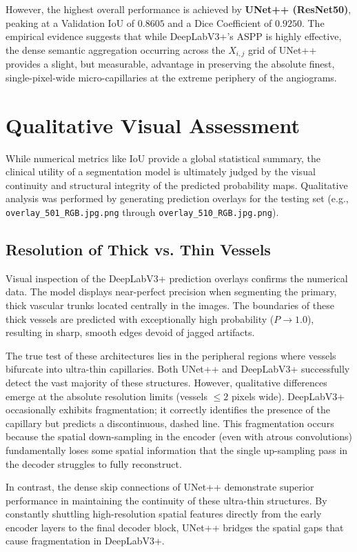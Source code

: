 However, the highest overall performance is achieved by \textbf{UNet++ (ResNet50)}, peaking at a Validation IoU of $0.8605$ and a Dice Coefficient of $0.9250$. The empirical evidence suggests that while DeepLabV3+'s ASPP is highly effective, the dense semantic aggregation occurring across the $X_{i,j}$ grid of UNet++ provides a slight, but measurable, advantage in preserving the absolute finest, single-pixel-wide micro-capillaries at the extreme periphery of the angiograms.

\section{Qualitative Visual Assessment}
While numerical metrics like IoU provide a global statistical summary, the clinical utility of a segmentation model is ultimately judged by the visual continuity and structural integrity of the predicted probability maps. Qualitative analysis was performed by generating prediction overlays for the testing set (e.g., \texttt{overlay\_501\_RGB.jpg.png} through \texttt{overlay\_510\_RGB.jpg.png}).

\subsection{Resolution of Thick vs. Thin Vessels}
Visual inspection of the DeepLabV3+ prediction overlays confirms the numerical data. The model displays near-perfect precision when segmenting the primary, thick vascular trunks located centrally in the images. The boundaries of these thick vessels are predicted with exceptionally high probability ($P \rightarrow 1.0$), resulting in sharp, smooth edges devoid of jagged artifacts.

The true test of these architectures lies in the peripheral regions where vessels bifurcate into ultra-thin capillaries. Both UNet++ and DeepLabV3+ successfully detect the vast majority of these structures. However, qualitative differences emerge at the absolute resolution limits (vessels $\le 2$ pixels wide). DeepLabV3+ occasionally exhibits fragmentation; it correctly identifies the presence of the capillary but predicts a discontinuous, dashed line. This fragmentation occurs because the spatial down-sampling in the encoder (even with atrous convolutions) fundamentally loses some spatial information that the single up-sampling pass in the decoder struggles to fully reconstruct.

In contrast, the dense skip connections of UNet++ demonstrate superior performance in maintaining the continuity of these ultra-thin structures. By constantly shuttling high-resolution spatial features directly from the early encoder layers to the final decoder block, UNet++ bridges the spatial gaps that cause fragmentation in DeepLabV3+. 

